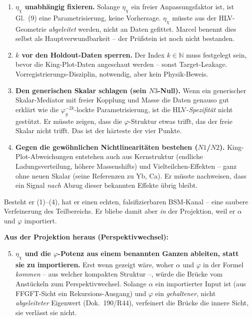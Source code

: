 \begin{enumerate}
  \item \textbf{$\eta_\chi$ unabhängig fixieren.} Solange $\eta_\chi$ ein
    freier Anpassungsfaktor ist, ist Gl.~(9) eine Parametrisierung, keine
    Vorhersage. $\eta_\chi$ müsste aus der HLV-Geometrie \emph{abgeleitet}
    werden, nicht an Daten gefittet. Marcel benennt dies selbst als
    Hauptverwundbarkeit -- der Prüfstein ist noch nicht bestanden.
  \item \textbf{$k$ vor den Holdout-Daten sperren.} Der Index $k \in
    \mathbb{N}$ muss festgelegt sein, bevor die King-Plot-Daten angeschaut
    werden -- sonst Target-Leakage. Vorregistrierungs-Disziplin, notwendig,
    aber kein Physik-Beweis.
  \item \textbf{Den generischen Skalar schlagen (sein $N3$-Null).} Wenn ein
    generischer Skalar-Mediator mit freier Kopplung und Masse die Daten
    genauso gut erklärt wie die $\varphi_g^{-2k}$-lockte Parametrisierung, ist
    die HLV-\emph{Spezifität} nicht gestützt. Er müsste zeigen, dass die
    $\varphi$-Struktur etwas trifft, das der freie Skalar nicht trifft. Das
    ist der härteste der vier Punkte.
  \item \textbf{Gegen die gewöhnlichen Nichtlinearitäten bestehen
    ($N1$/$N2$).} King-Plot-Abweichungen entstehen auch aus Kernstruktur
    (endliche Ladungsverteilung, höhere Massenshifts) und
    Vielteilchen-Effekten -- ganz ohne neuen Skalar (seine Referenzen zu Yb,
    Ca). Er müsste nachweisen, dass ein Signal \emph{nach} Abzug dieser
    bekannten Effekte übrig bleibt.
\end{enumerate}

Besteht er (1)--(4), hat er einen echten, falsifizierbaren BSM-Kanal -- eine
saubere Verfeinerung des Teilbereichs. Er bliebe damit aber \emph{in} der
Projektion, weil er $\alpha$ und $\varphi$ importiert.

\textbf{Aus der Projektion heraus (Perspektivwechsel):}

\begin{enumerate}
  \setcounter{enumi}{4}
  \item \textbf{$\eta_\chi$ und die $\varphi$-Potenz aus einem benannten
    Ganzen ableiten, statt sie zu importieren.} Erst wenn gezeigt wäre, woher
    $\alpha$ und $\varphi$ in der Formel \emph{kommen} -- aus welcher
    kompakten Struktur --, würde die Brücke vom Anstückeln zum
    Perspektivwechsel. Solange $\alpha$ ein importierter Input ist (aus
    FFGFT-Sicht ein Rekursions-Ausgang) und $\varphi$ ein \emph{gehaltener},
    nicht \emph{abgeleiteter} Eigenwert (Dok.~190/R44), verfeinert die Brücke
    die innere Sicht, sie verlässt sie nicht.
\end{enumerate}

